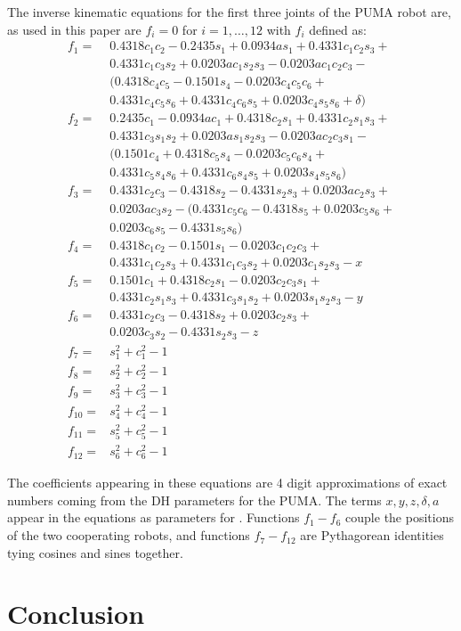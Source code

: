 \documentclass[12pt]{report}
\begin{document}
\label{app:eqns}
The inverse kinematic equations for the first three joints of the PUMA robot are, as used in this paper are $f_i=0$ for $i=1,\ldots,12$ with $f_i$ defined as:
\begin{align*}
f_1 =& 0.4318 c_1 c_2 - 0.2435 s_1 + 0.0934 a s_1 + 0.4331 c_1 c_2 s_3 + \\
	&0.4331 c_1 c_3 s_2 + 0.0203 a c_1 s_2 s_3 - 0.0203 a c_1 c_2 c_3 - \\
	&(0.4318 c_4 c_5 - 0.1501 s_4 - 0.0203 c_4 c_5 c_6 + \\
	&0.4331 c_4 c_5 s_6 + 0.4331 c_4 c_6 s_5 + 0.0203 c_4 s_5 s_6+\delta)\\
f_2 =& 0.2435 c_1 - 0.0934 a c_1 + 0.4318 c_2 s_1 + 0.4331 c_2 s_1 s_3 + \\
	&0.4331 c_3 s_1 s_2 + 0.0203 a s_1 s_2 s_3 - 0.0203 a c_2 c_3 s_1 - \\
	&(0.1501 c_4 + 0.4318 c_5 s_4 - 0.0203 c_5 c_6 s_4 + \\
	&0.4331 c_5 s_4 s_6 + 0.4331 c_6 s_4 s_5 + 0.0203 s_4 s_5 s_6)\\
f_3 =& 0.4331 c_2 c_3 - 0.4318 s_2 - 0.4331 s_2 s_3 + 0.0203 a c_2 s_3 + \\
	&0.0203 a c_3 s_2 - (0.4331 c_5 c_6 - 0.4318 s_5 + 0.0203 c_5 s_6 + \\
	&0.0203 c_6 s_5 - 0.4331 s_5 s_6)\\
f_4 =& 0.4318 c_1 c_2 - 0.1501 s_1 - 0.0203 c_1 c_2 c_3 + \\
	&0.4331 c_1 c_2 s_3 + 0.4331 c_1 c_3 s_2 + 0.0203 c_1 s_2 s_3 - x\\
f_5 =& 0.1501 c_1 + 0.4318 c_2 s_1 - 0.0203 c_2 c_3 s_1 + \\
	&0.4331 c_2 s_1 s_3 + 0.4331 c_3 s_1 s_2 + 0.0203 s_1 s_2 s_3 - y\\
f_6 =& 0.4331 c_2 c_3 - 0.4318 s_2 + 0.0203 c_2 s_3 + \\
	&0.0203 c_3 s_2 - 0.4331 s_2 s_3 - z\\
f_7 =& s_1^2+c_1^2-1\\
f_8 =& s_2^2+c_2^2-1\\
f_9 =& s_3^2+c_3^2-1\\
f_{10} =& s_4^2+c_4^2-1\\
f_{11} =& s_5^2+c_5^2-1\\
f_{12} =& s_6^2+c_6^2-1
\end{align*}

The coefficients appearing in these equations are 4 digit approximations of exact numbers coming from the DH parameters for the PUMA.  The terms $x, y, z, \delta, a$ appear in the equations as parameters for \bertini.  Functions $f_1 - f_6$ couple the positions of the two cooperating robots, and functions $f_7 - f_{12}$ are Pythagorean identities tying cosines and sines together.



\chapter{Conclusion}



\end{document}
